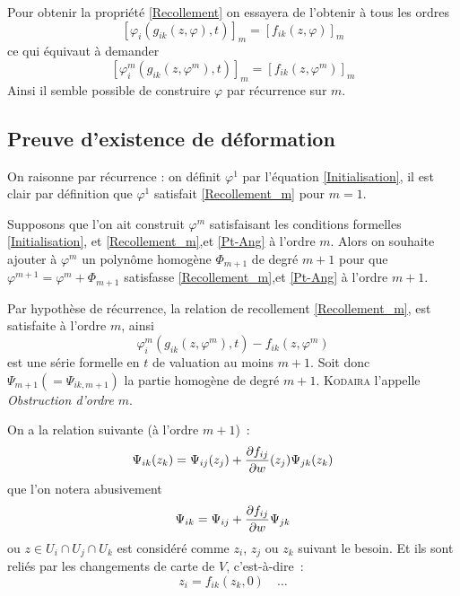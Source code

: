 \documentclass[a4paper,11pt,draft,makeidx,twocolumn]{amsart}
\begin{document}
Pour obtenir la propriété \eqref{Recollement} on essayera de l'obtenir à tous les ordres
\begin{equation}\label{recollement_m}
\left[\varphi_i(g_{ik}(z,\varphi),t)\right]_m = \left[f_{ik}(z, \varphi)\right]_m
\end{equation}
ce qui équivaut à demander
\begin{equation}\label{Recollement_m}
\left[\varphi^m_i(g_{ik}(z,\varphi^m),t)\right]_m = \left[f_{ik}(z, \varphi^m)\right]_m
\end{equation}
Ainsi il semble possible de construire $\varphi$ par récurrence sur $m$.

\subsection{Preuve d'existence de déformation}
On raisonne par récurrence : on définit $\varphi^1$ par l'équation \eqref{Initialisation}, il est clair par définition que $\varphi^1$ satisfait \eqref{Recollement_m} pour $m=1$.

Supposons que l'on ait construit $\varphi^m$ satisfaisant les conditions formelles \eqref{Initialisation}, et \eqref{Recollement_m},et \eqref{Pt-Ang} à l'ordre $m$. Alors on souhaite ajouter à $\varphi^m$ un polynôme homogène $\Phi_{m+1}$ de degré $m+1$ pour que $\varphi^{m+1} = \varphi^m + \Phi_{m+1}$ satisfasse  \eqref{Recollement_m},et \eqref{Pt-Ang} à l'ordre $m+1$.

Par hypothèse de récurrence, la relation de recollement \eqref{Recollement_m}, est satisfaite à l'ordre $m$, ainsi
\begin{equation}
\varphi^m_i(g_{ik}(z,\varphi^m),t) - f_{ik}(z, \varphi^m)
\end{equation}
est une série formelle en $t$ de valuation au moins $m+1$. Soit donc $\Psi_{m+1} (=\Psi_{ik, m+1})$ la partie homogène de degré $m+1$. \textsc{Kodaira} l'appelle \emph{Obstruction d'ordre} $m$.

On a la relation suivante (à l'ordre $m+1$)~:
\begin{equation}
\Psi_{ik}(z_k) = \Psi_{ij}(z_j) + \dfrac{\partial{f_{ij}}}{\partial{w}}(z_j)\Psi_{jk}(z_k)
\end{equation}
que l'on notera abusivement
\begin{equation}
\Psi_{ik} = \Psi_{ij} + \dfrac{\partial{f_{ij}}}{\partial{w}}\Psi_{jk}
\end{equation}
ou $z \in U_i \cap U_j \cap U_k$ est considéré comme $z_i$, $z_j$ ou $z_k$ suivant le besoin. Et ils sont reliés par les changements de carte de $V$, c'est-à-dire~:
\begin{equation}
z_i = f_{ik}(z_k,0) \quad \dots
\end{equation}
\end{document}

